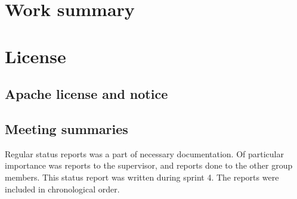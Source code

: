 
\chapter{Work summary}


\chapter{License }
\section{Apache license and notice}
\label{appendix:license}

\section{Meeting summaries}
Regular status reports was a part of necessary documentation. Of particular importance was reports to the supervisor, and reports done to the other group members. This status report was written during sprint 4. The reports were included in chronological order.










